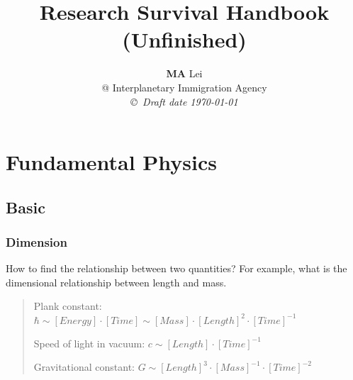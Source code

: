 \documentclass[11pt]{book}
\begin{document}
\title{Research Survival Handbook \\ (\textbf{Unfinished})}
\author{{\bf MA} Lei  \\
@ Interplanetary Immigration Agency \\
{\small\em \copyright \ Draft date \today}}
\date{}
\maketitle

\frontmatter
\tableofcontents







\iffalse
\chapter{Preface}

I have a bad memory, very bad. So bad that I can hardly remember anything.

I tried many many ways of pushing myself to the frontier of physics. That bad memory really pisses me off. So I decided to borrow the power of paper and computers.
\fi



\mainmatter
\part{Fundamental Physics}

\chapter{Basic}

\section{Dimension}

How to find the relationship between two quantities? For example, what is the dimensional relationship between length and mass.
\begin{quotation}
Plank constant: $\hbar \sim [Energy]\cdot [Time] \sim [Mass]\cdot [Length]^2 \cdot [Time]^{-1}$ 

Speed of light in vacuum: $c\sim [Length]\cdot [Time]^{-1}$

Gravitational constant: $G \sim [Length]^3\cdot [Mass]^{-1} \cdot [Time]^{-2}$
\end{quotation}
\end{document}
